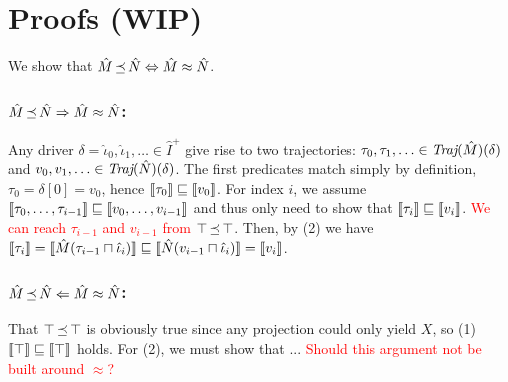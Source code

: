 \section{Proofs (WIP)}

We show that $\hat M \operatorname{\preceq} \hat N \Leftrightarrow \hat M \approx \hat N$.

\subsubsection{$\hat M \operatorname{\preceq} \hat N \Rightarrow \hat M \approx \hat N$:}

Any driver $\delta = \hat \iota_{0}, \hat \iota_{1}, \ldots \in \hat I^{+}$ give rise to two trajectories: $\tau_{0}, \tau_{1}, \ldots \in \operatorname{\textit{Traj}}(\hat M)(\delta)$ and $v_{0}, v_{1}, \ldots \in \operatorname{\textit{Traj}}(\hat N)(\delta)$. The first predicates match simply by definition, $\tau_{0} = \delta[0] = v_{0}$, hence $\llbracket\tau_{0}\rrbracket \sqsubseteq \llbracket v_{0}\rrbracket$. For index $i$, we assume $\llbracket\tau_{0}, \ldots, \tau_{i-1}\rrbracket \sqsubseteq \llbracket v_{0}, \ldots, v_{i-1}\rrbracket$ and thus only need to show that $\llbracket\tau_{i}\rrbracket \sqsubseteq \llbracket v_{i}\rrbracket$. \textcolor{red}{We can reach $\tau_{i-1}$ and $v_{i-1}$ from $\top \operatorname{\preceq} \top$}. Then, by (2) we have $\llbracket\tau_{i}\rrbracket = \llbracket\hat M(\tau_{i-1} \sqcap \hat \iota_{i})\rrbracket \sqsubseteq \llbracket\hat N(v_{i-1} \sqcap \hat \iota_{i})\rrbracket = \llbracket v_{i}\rrbracket$.

\subsubsection{$\hat M \operatorname{\preceq} \hat N \Leftarrow \hat M \approx \hat N$:}

That $\top \operatorname{\preceq} \top$ is obviously true since any projection could only yield $X$, so (1) $\llbracket\top\rrbracket \sqsubseteq \llbracket\top\rrbracket$ holds. For (2), we must show that ... \textcolor{red}{Should this argument not be built around $\approx$?}
